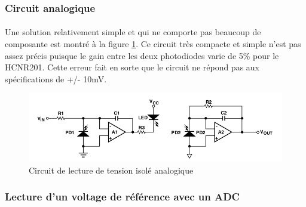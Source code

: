 	\subsubsection*{Circuit analogique}
	\paragraph*{}
	Une solution relativement simple et qui ne comporte pas beaucoup de composante est montré à la figure \ref{fig:HCNR201}. Ce circuit très compacte et simple n'est pas assez précis puisque le gain entre les deux photodiodes varie de 5\% pour le HCNR201. Cette erreur fait en sorte que le circuit ne répond pas aux spécifications de +/- 10mV.  
	
	\begin{figure}[H]
		\centering
		\includegraphics[scale = 0.5]{Images/Analogique.png}
		\caption{Circuit de lecture de tension isolé analogique \cite{HCNR201}}
		\label{fig:HCNR201}
	\end{figure}

	\subsubsection*{Lecture d'un voltage de référence avec un ADC}
	\paragraph*{}	
	
	
	
	
	
	
	
	
	
	